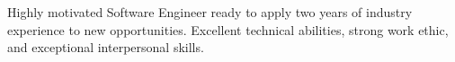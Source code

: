 \documentclass[letter,10pt]{article}
\begin{document}

Highly motivated Software Engineer ready to apply two years of industry experience to new opportunities. Excellent technical abilities, strong work ethic, and exceptional interpersonal skills.

\end{document}
